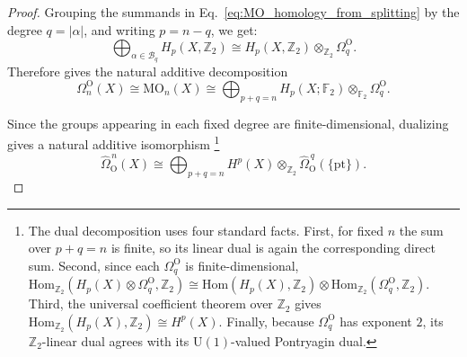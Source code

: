 \documentclass[aps,prx,reprint,superscriptaddress,twocolumn,amsmath,amssymb,amsfonts, nofootinbib]{revtex4-2}
\newcommand{\Z}{\mathbb{Z}}
\theoremstyle{apsstyle}
\begin{document}
\begin{proof}
Grouping the summands in Eq.~\eqref{eq:MO_homology_from_splitting} by the degree $q=|\alpha|$, and writing $p=n-q$, we get:
\begin{equation*}
    \bigoplus_{\alpha\in\mathcal B_q}
    H_{p}(X,\mathbb Z_2)\cong H_{p}(X, \Z_{2})\otimes_{\Z_{2}}\Omega^{\mathrm O}_{q}.
\end{equation*}
Therefore gives the natural additive decomposition
\begin{equation}
    \Omega_n^{\mathrm O}(X)
    \cong
    \mathrm{MO}_n(X)
    \cong
    \bigoplus_{p+q=n}
    H_p(X;\mathbb F_2)
    \otimes_{\mathbb F_2}
    \Omega_q^{\mathrm O}.
    \label{eq:MO_homology_additive_decomposition}
\end{equation}


Since the groups appearing in each fixed degree are finite-dimensional, dualizing gives a natural additive isomorphism
\footnote{The dual decomposition uses four standard facts. First, for fixed $n$ the sum over $p+q=n$ is finite, so its linear dual is again the corresponding direct sum. Second, since each $\Omega_q^{\mathrm O}$ is finite-dimensional, $\mathrm{Hom}_{\Z_{2}}(H_p(X)\otimes\Omega_q^{\mathrm O}, \Z_{2}) \cong \mathrm{Hom}(H_p(X),\Z_{2})\otimes\mathrm{Hom}_{\Z_{2}}(\Omega_q^{\mathrm O},\Z_{2})$. Third, the universal coefficient theorem over $\mathbb Z_2$ gives $\mathrm{Hom}_{\Z_{2}}(H_p(X),\Z_{2})\cong H^p(X)$. Finally, because $\Omega_q^{\mathrm O}$ has exponent $2$, its $\mathbb Z_2$-linear dual agrees with its $\mathrm U(1)$-valued Pontryagin dual.}
\begin{equation}
    \widehat{\Omega}_{\mathrm O}^{\,n}(X)
    \cong
    \bigoplus_{p+q=n}
    H^p(X)\otimes_{\mathbb Z_2}
    \widehat{\Omega}_{\mathrm O}^{\,q}(\{\mathrm{pt}\}).
    \label{eq:dual_MO_additive_decomposition}
\end{equation}


\end{proof}
\end{document}
